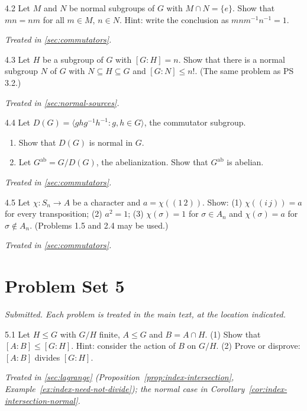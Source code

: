 \documentclass[11pt]{report}
\begin{document}
\begin{hwbox}{4.2}\label{hw:4.2}
Let $M$ and $N$ be normal subgroups of $G$ with $M \cap N = \{e\}$. Show that $mn = nm$ for all $m \in M$, $n \in N$. Hint: write the conclusion as $mnm^{-1}n^{-1} = 1$.
\end{hwbox}
\textit{Treated in \ref{sec:commutators}.}

\begin{hwbox}{4.3}\label{hw:4.3}
Let $H$ be a subgroup of $G$ with $[G : H] = n$. Show that there is a normal subgroup $N$ of $G$ with $N \subseteq H \subseteq G$ and $[G : N] \leq n!$. (The same problem as PS 3.2.)
\end{hwbox}
\textit{Treated in \ref{sec:normal-sources}.}

\begin{hwbox}{4.4}\label{hw:4.4}
Let $D(G) = \langle ghg^{-1}h^{-1} : g, h \in G \rangle$, the commutator subgroup.
\begin{enumerate}
    \item Show that $D(G)$ is normal in $G$.
    \item Let $G^{\mathrm{ab}} = G/D(G)$, the abelianization. Show that $G^{\mathrm{ab}}$ is abelian.
\end{enumerate}
\end{hwbox}
\textit{Treated in \ref{sec:commutators}.}

\begin{hwbox}{4.5}\label{hw:4.5}
Let $\chi: S_n \to A$ be a character and $a = \chi((1\,2))$. Show: (1) $\chi((i\,j)) = a$ for every transposition; (2) $a^2 = 1$; (3) $\chi(\sigma) = 1$ for $\sigma \in A_n$ and $\chi(\sigma) = a$ for $\sigma \notin A_n$. (Problems 1.5 and 2.4 may be used.)
\end{hwbox}
\textit{Treated in \ref{sec:commutators}.}

\section*{Problem Set 5}
{}

\textit{Submitted. Each problem is treated in the main text, at the location indicated.}

\begin{hwbox}{5.1}\label{hw:5.1}
Let $H \leq G$ with $G/H$ finite, $A \leq G$ and $B = A \cap H$. (1) Show that $[A : B] \leq [G : H]$. Hint: consider the action of $B$ on $G/H$. (2) Prove or disprove: $[A : B]$ divides $[G : H]$.
\end{hwbox}
\textit{Treated in \ref{sec:lagrange} (Proposition~\ref{prop:index-intersection}, Example~\ref{ex:index-need-not-divide}); the normal case in Corollary~\ref{cor:index-intersection-normal}.}
\end{document}
